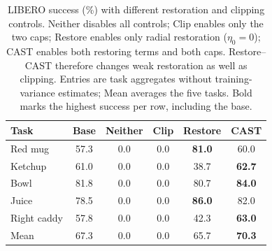\begin{table}[H]
\centering
\caption{LIBERO success (\%) with different restoration and clipping
controls. Neither disables all controls; Clip enables only the two caps;
Restore enables only radial restoration ($\eta_0=0$); CAST enables both
restoring terms and both caps. Restore--CAST therefore changes weak
restoration as well as clipping. Entries are task aggregates without
training-variance estimates; Mean averages the five tasks. Bold marks
the highest success per row, including the base.}
\label{tab:ablations}
\small
\setlength{\tabcolsep}{3pt}
\begin{tabular}{@{}lccccc@{}}
\toprule
Task & Base & Neither & Clip & Restore & CAST \\
\midrule
Red mug & 57.3 & 0.0 & 0.0 & \textbf{81.0} & 60.0 \\
Ketchup & 61.0 & 0.0 & 0.0 & 38.7 & \textbf{62.7} \\
Bowl & 81.8 & 0.0 & 0.0 & 80.7 & \textbf{84.0} \\
Juice & 78.5 & 0.0 & 0.0 & \textbf{86.0} & 82.0 \\
Right caddy & 57.8 & 0.0 & 0.0 & 42.3 & \textbf{63.0} \\
\midrule
Mean & 67.3 & 0.0 & 0.0 & 65.7 & \textbf{70.3} \\
\bottomrule
\end{tabular}
\end{table}

